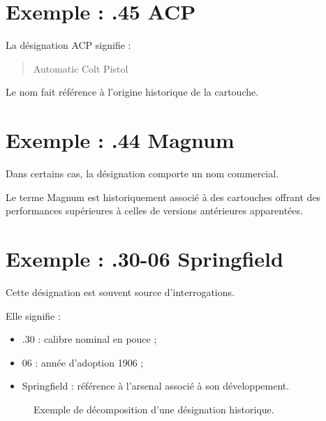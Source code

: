 \section{Exemple : .45 ACP}

La désignation ACP signifie :

\begin{quote}
Automatic Colt Pistol
\end{quote}

Le nom fait référence à l'origine historique de la cartouche.

\section{Exemple : .44 Magnum}

Dans certains cas, la désignation comporte un nom commercial.

Le terme Magnum est historiquement associé à des cartouches offrant des
performances supérieures à celles de versions antérieures apparentées.

\section{Exemple : .30-06 Springfield}

Cette désignation est souvent source d'interrogations.

Elle signifie :

\begin{itemize}
    \item .30 : calibre nominal en pouce ;
    \item 06 : année d'adoption 1906 ;
    \item Springfield : référence à l'arsenal associé à son développement.
\end{itemize}

\begin{figure}[htbp]
\centering


\caption{Exemple de décomposition d'une désignation historique.}
\label{fig:designation_3006}

\end{figure}


